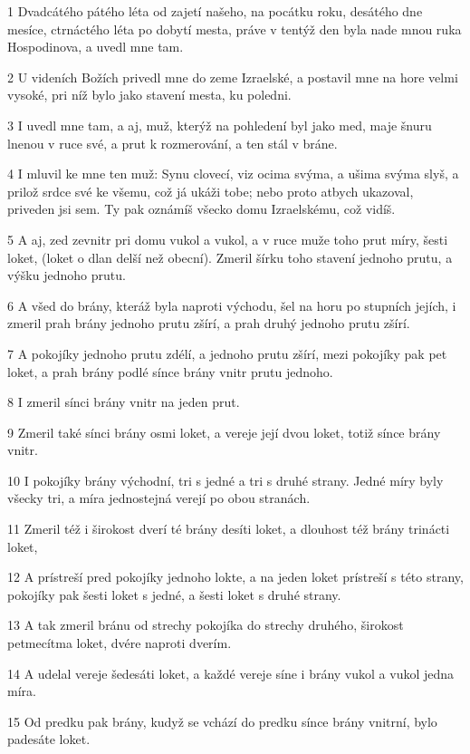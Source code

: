 \par 1 Dvadcátého pátého léta od zajetí našeho, na pocátku roku, desátého dne mesíce, ctrnáctého léta po dobytí mesta, práve v tentýž den byla nade mnou ruka Hospodinova, a uvedl mne tam.
\par 2 U videních Božích privedl mne do zeme Izraelské, a postavil mne na hore velmi vysoké, pri níž bylo jako stavení mesta, ku poledni.
\par 3 I uvedl mne tam, a aj, muž, kterýž na pohledení byl jako med, maje šnuru lnenou v ruce své, a prut k rozmerování, a ten stál v bráne.
\par 4 I mluvil ke mne ten muž: Synu clovecí, viz ocima svýma, a ušima svýma slyš, a prilož srdce své ke všemu, což já ukáži tobe; nebo proto atbych ukazoval, priveden jsi sem. Ty pak oznámíš všecko domu Izraelskému, což vidíš.
\par 5 A aj, zed zevnitr pri domu vukol a vukol, a v ruce muže toho prut míry, šesti loket, (loket o dlan delší než obecní). Zmeril šírku toho stavení jednoho prutu, a výšku jednoho prutu.
\par 6 A všed do brány, kteráž byla naproti východu, šel na horu po stupních jejích, i zmeril prah brány jednoho prutu zšírí, a prah druhý jednoho prutu zšírí.
\par 7 A pokojíky jednoho prutu zdélí, a jednoho prutu zšírí, mezi pokojíky pak pet loket, a prah brány podlé sínce brány vnitr prutu jednoho.
\par 8 I zmeril sínci brány vnitr na jeden prut.
\par 9 Zmeril také sínci brány osmi loket, a vereje její dvou loket, totiž sínce brány vnitr.
\par 10 I pokojíky brány východní, tri s jedné a tri s druhé strany. Jedné míry byly všecky tri, a míra jednostejná verejí po obou stranách.
\par 11 Zmeril též i širokost dverí té brány desíti loket, a dlouhost též brány trinácti loket,
\par 12 A prístreší pred pokojíky jednoho lokte, a na jeden loket prístreší s této strany, pokojíky pak šesti loket s jedné, a šesti loket s druhé strany.
\par 13 A tak zmeril bránu od strechy pokojíka do strechy druhého, širokost petmecítma loket, dvére naproti dverím.
\par 14 A udelal vereje šedesáti loket, a každé vereje síne i brány vukol a vukol jedna míra.
\par 15 Od predku pak brány, kudyž se vchází do predku sínce brány vnitrní, bylo padesáte loket.
